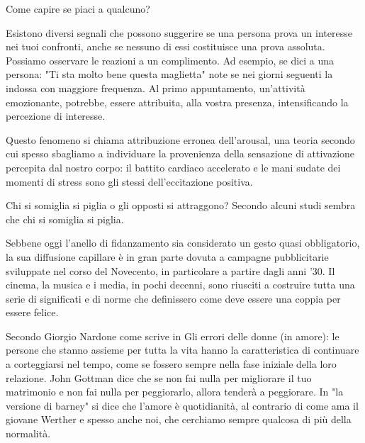 \documentclass[12pt]{book} %
\begin{document}
\begin{mdframed}[linewidth=1pt]
Come capire se piaci a qualcuno?

Esistono diversi segnali che possono suggerire se una persona prova un interesse nei tuoi confronti, anche se nessuno di essi costituisce una prova assoluta. Possiamo osservare le reazioni a un complimento. Ad esempio, se dici a una persona: "Ti sta molto bene questa maglietta" note se nei giorni seguenti la indossa con maggiore frequenza.
Al primo appuntamento, un'attività emozionante, potrebbe, essere attribuita, alla vostra presenza, intensificando la percezione di interesse.

Questo fenomeno si chiama attribuzione erronea dell'arousal, una teoria secondo cui spesso sbagliamo a individuare la provenienza della sensazione di attivazione percepita dal nostro corpo: il battito cardiaco accelerato e le mani sudate dei momenti di stress sono gli stessi dell'eccitazione positiva.

Chi si somiglia si piglia o gli opposti si attraggono? Secondo alcuni studi sembra che chi si somiglia si piglia.
\end{mdframed}

Sebbene oggi l’anello di fidanzamento sia considerato un gesto quasi obbligatorio, la sua diffusione capillare è in gran parte dovuta a campagne pubblicitarie sviluppate nel corso del Novecento, in particolare a partire dagli anni ’30. Il
cinema, la musica e i media, in pochi decenni, sono riusciti a costruire tutta una serie di significati e di norme che
definissero come deve essere una coppia per essere felice.

Secondo Giorgio Nardone come scrive in Gli errori delle donne (in amore): le persone che stanno assieme per tutta la vita hanno la caratteristica di continuare a corteggiarsi nel tempo, come se fossero
sempre nella fase iniziale della loro relazione. John Gottman dice che se non fai nulla per migliorare il tuo
matrimonio e non fai nulla per peggiorarlo, allora tenderà a peggiorare.
In "la versione di barney" si dice che l'amore è quotidianità, al contrario di come ama il giovane Werther e spesso anche noi, che cerchiamo sempre qualcosa di più della normalità.
\end{document}
